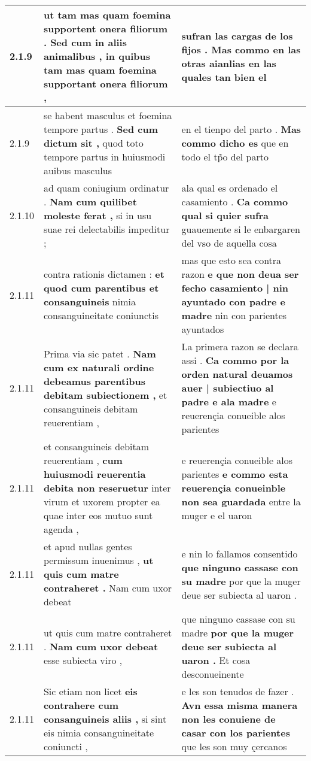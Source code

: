 \begin{tabular}{|p{1cm}|p{6.5cm}|p{6.5cm}|}
2.1.9 & ut tam mas quam foemina supportent onera filiorum . \textbf{ Sed cum in aliis animalibus , } in quibus tam mas quam foemina supportant onera filiorum , & sufran las cargas de los fijos . \textbf{ Mas commo en las otras aianlias } en las quales tan bien el \\\hline
2.1.9 & se habent masculus et foemina tempore partus . \textbf{ Sed cum dictum sit , } quod toto tempore partus in huiusmodi auibus masculus & en el tienpo del parto . \textbf{ Mas commo dicho es } que en todo el tp̃o del parto \\\hline
2.1.10 & ad quam coniugium ordinatur . \textbf{ Nam cum quilibet moleste ferat , } si in usu suae rei delectabilis impeditur ; & ala qual es ordenado el casamiento . \textbf{ Ca commo qual si quier sufra } guauemente si le enbargaren del vso de aquella cosa \\\hline
2.1.11 & contra rationis dictamen : \textbf{ et quod cum parentibus et consanguineis } nimia consanguineitate coniunctis & mas que esto sea contra razon \textbf{ e que non deua ser fecho casamiento | nin ayuntado con padre e madre } nin con parientes ayuntados \\\hline
2.1.11 & Prima via sic patet . \textbf{ Nam cum ex naturali ordine debeamus parentibus debitam subiectionem , } et consanguineis debitam reuerentiam , & La primera razon se declara assi . \textbf{ Ca commo por la orden natural deuamos auer | subiectiuo al padre e ala madre } e reuerençia conueible alos parientes \\\hline
2.1.11 & et consanguineis debitam reuerentiam , \textbf{ cum huiusmodi reuerentia debita non reseruetur } inter virum et uxorem propter ea quae inter eos mutuo sunt agenda , & e reuerençia conueible alos parientes \textbf{ e commo esta reuerençia conueinble non sea guardada } entre la muger e el uaron \\\hline
2.1.11 & et apud nullas gentes permissum inuenimus , \textbf{ ut quis cum matre contraheret . } Nam cum uxor debeat & e nin lo fallamos consentido \textbf{ que ninguno cassase con su madre } por que la muger deue ser subiecta al uaron . \\\hline
2.1.11 & ut quis cum matre contraheret . \textbf{ Nam cum uxor debeat } esse subiecta viro , & que ninguno cassase con su madre \textbf{ por que la muger deue ser subiecta al uaron . } Et cosa desconueinente \\\hline
2.1.11 & Sic etiam non licet \textbf{ eis contrahere cum consanguineis aliis , } si sint eis nimia consanguineitate coniuncti , & e les son tenudos de fazer . \textbf{ Avn essa misma manera non les conuiene de casar con los parientes } que les son muy çercanos \\\hline

\end{tabular}
